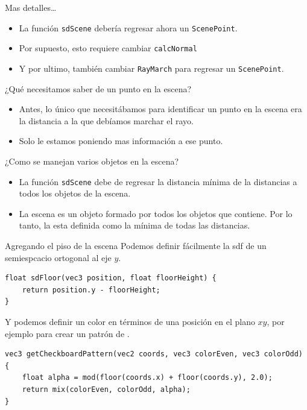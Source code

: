 \begin{frame}[fragile]{Mas detalles\ldots}
\begin{itemize}
    \item La función \texttt{sdScene} debería regresar ahora un \texttt{ScenePoint}.
    \item Por supuesto, esto requiere cambiar \texttt{calcNormal}
    \item Y por ultimo, también cambiar \texttt{RayMarch} para regresar un \texttt{ScenePoint}. 
\end{itemize}

\begin{block}{¿Qué necesitamos saber de un punto en la escena?}
    \begin{itemize}
        \item Antes, lo único que necesitábamos para identificar un punto en la escena era la distancia a la que debíamos marchar el rayo.
        
        \item Solo le estamos poniendo mas información a ese punto.
    \end{itemize}
\end{block}

\begin{block}{¿Como se manejan varios objetos en la escena?}
    \begin{itemize}
        \item La función \texttt{sdScene} debe de regresar la \alert{distancia mínima} de la distancias a todos los objetos de la escena. 
        
        \item La escena es un objeto formado por todos los objetos que contiene. Por lo tanto, la  esta definida como la mínima de todas las distancias.
    \end{itemize}
\end{block}
\end{frame}

\begin{frame}[fragile]{Agregando el piso de la escena}
Podemos definir fácilmente la sdf de un semiespcacio ortogonal al eje $y$.
\begin{listing}
\begin{verbatim}
float sdFloor(vec3 position, float floorHeight) {
    return position.y - floorHeight;
}
\end{verbatim}
\end{listing}
Y podemos definir un color en términos de una posición en el plano $xy$, por ejemplo para crear un patrón de .
\begin{listing}
\begin{verbatim}
vec3 getCheckboardPattern(vec2 coords, vec3 colorEven, vec3 colorOdd) {
    float alpha = mod(floor(coords.x) + floor(coords.y), 2.0);
    return mix(colorEven, colorOdd, alpha);
}
\end{verbatim}
\end{listing}

\end{frame}

